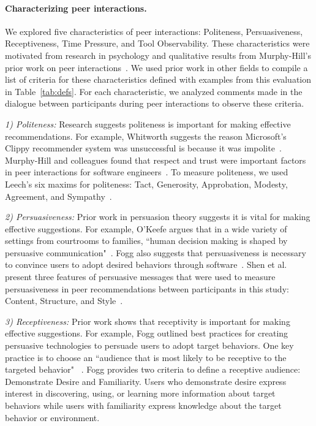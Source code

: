 \paragraph{Characterizing peer interactions.} We explored five characteristics of peer interactions: Politeness, Persuasiveness, Receptiveness, Time Pressure, and Tool Observability. These characteristics were motivated from research in psychology and qualitative results from Murphy-Hill's prior work on peer interactions~\cite{Murphy-Hill2015HowDoUsers}. We used prior work in other fields to compile a list of criteria for these characteristics defined with examples from this evaluation in Table~\ref{tab:defs}. For each characteristic, we analyzed comments made in the dialogue between participants during peer interactions to observe these criteria. 

\textit{1) Politeness:} Research suggests politeness is important for making effective recommendations. For example, Whitworth suggests the reason Microsoft's Clippy recommender system was unsuccessful is because it was
impolite~\cite{WhitworthPolite}. 
Murphy-Hill and colleagues found that 
respect and trust 
were important factors in 
peer interactions for software engineers~\cite{Murphy-Hill2015HowDoUsers}. 
To measure politeness,
we used Leech's six maxims for politeness: 
Tact, Generosity, Approbation, Modesty, 
Agreement, and Sympathy~\cite{LeechPragmatics}.

\textit{2) Persuasiveness:} Prior work in persuasion theory suggests it is vital for making effective suggestions. For example, O'Keefe argues that in a wide variety of settings from courtrooms to families, ``human decision making is shaped by persuasive communication"~\cite[p.~31]{okeefe2002persuasion}. Fogg also suggests that persuasiveness is necessary to convince users to adopt desired behaviors through software~\cite{Fogg2009Persuasive}. Shen et al. present three features of persuasive messages that were used to measure persuasiveness in peer recommendations between participants in this study: Content, Structure, and Style~\cite{ShenMessageFeatures}.

\textit{3) Receptiveness:} Prior work shows that receptivity is important for making effective suggestions. For example, Fogg outlined best practices for creating
persuasive technologies to persuade users to adopt target behaviors. One key practice is to choose an ``audience that is most likely to be receptive to the targeted behavior" ~\cite{Fogg2009Persuasive}. Fogg provides two criteria to define a receptive audience: Demonstrate Desire and Familiarity. Users who demonstrate desire express interest in discovering, using, or learning more information about target behaviors while users with familiarity express knowledge about the target behavior or environment.

